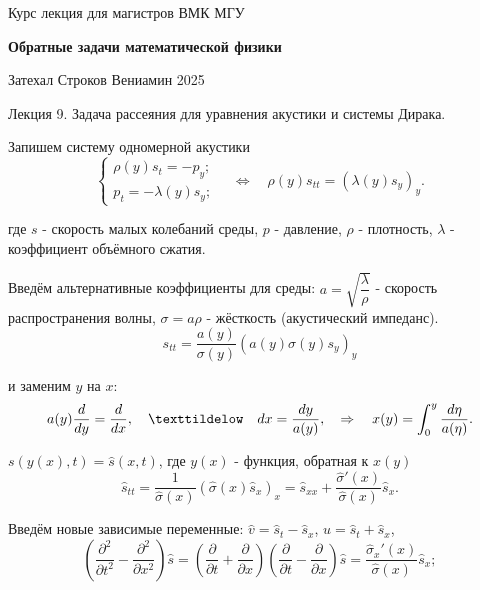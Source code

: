 \documentclass{article}
\begin{document}
\centerline{\large Курс лекция для магистров ВМК МГУ}
\centerline {\textbf{\LARGE Обратные задачи математической физики}}
\centerline {Затехал Строков Вениамин 2025}

\vspace{0.4cm}

\centerline{\LARGE 	Лекция 9. Задача рассеяния для уравнения акустики и системы Дирака.}

\vspace{0.5cm}

Запишем систему одномерной акустики
\begin{equation*}
\begin{cases}
	\rho(y) s_t = - p_y;\\
	p_t = -\lambda(y) s_y;
\end{cases}
\quad \Leftrightarrow \quad
\rho(y)s_{tt} = (\lambda(y)s_y)_y.
\end{equation*}

где $s$ - скорость малых колебаний среды, $p$ - давление, $\rho$ - плотность, $\lambda$ - коэффициент объёмного сжатия.

Введём альтернативные коэффициенты для среды: 
$a=\sqrt{\dfrac{\lambda}{\rho}}$ - скорость распространения волны, $\sigma = a\rho$ - жёсткость (акустический импеданс).
\begin{equation*}
	s_{tt} = \dfrac{a(y)}{\sigma(y)}(a(y)\sigma(y) s_y)_y
\end{equation*}

и заменим $y$ на $x$:
\begin{equation*}
	a(y)\dfrac{d}{dy} = \dfrac{d}{dx} ,
	\quad \texttildelow \quad
	dx = \dfrac{dy}{a(y)},
	\quad \Rightarrow \quad
	x(y) = \int_0^y \dfrac{d\eta}{a(\eta)}.
\end{equation*}

$s(y(x),t) = \hat{s}(x,t)$, где $y(x)$ - функция, обратная к $x(y)$ 
\begin{equation*}
	\hat{s}_{tt} = \dfrac{1}{\hat{\sigma}(x)}(\hat{\sigma}(x) \hat{s}_x)_x = \hat{s}_{xx}+\dfrac{\hat{\sigma}'(x)}{\hat{\sigma}(x)} \hat{s}_x.
\end{equation*}

Введём новые зависимые переменные:
$\hat{v} = \hat{s}_t - \hat{s}_x$, $\hat{u} = \hat{s}_t + \hat{s}_x$,
\begin{equation*}
	(\dfrac{\partial^2}{\partial t^2} - \dfrac{\partial^2}{\partial x^2}) \hat{s} =
	(\dfrac{\partial}{\partial t} + \dfrac{\partial}{\partial x})			(\dfrac{\partial}{\partial t} - \dfrac{\partial}{\partial x}) \hat{s} =
	 \dfrac{\hat{\sigma}_x'(x)}{\hat{\sigma}(x)} \hat{s}_x;
\end{equation*}
\end{document}
